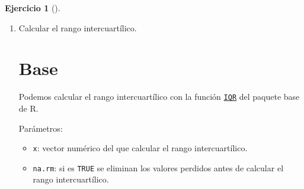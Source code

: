 \documentclass[
  a4paper,
]{scrreport}
\newenvironment{Shaded}{\begin{snugshade}}{\end{snugshade}}
\newcommand{\ExtensionTok}[1]{\textcolor[rgb]{0.00,0.23,0.31}{#1}}
\newcommand{\NormalTok}[1]{\textcolor[rgb]{0.00,0.23,0.31}{#1}}
\providecommand{\tightlist}{%
  \setlength{\itemsep}{0pt}\setlength{\parskip}{0pt}}\usepackage{longtable,booktabs,array}
\theoremstyle{definition}
\newtheorem{exercise}{Ejercicio}[chapter]
\theoremstyle{remark}
\begin{document}
\begin{exercise}[]
\begin{enumerate}
\begin{tcolorbox}
  \begin{longtable}[]{@{}r@{}}
  \toprule\noalign{}
  rango \\
  \midrule\noalign{}
  \endhead
  \bottomrule\noalign{}
  \endlastfoot
  5 \\
  \end{longtable}

  \section{Copilot}

\begin{Shaded}
\begin{Highlighting}[]
\ExtensionTok{Calcular}\NormalTok{ el rango de la columna medicamentos del data frame df.}
\end{Highlighting}
\end{Shaded}

  \end{tcolorbox}
\item
  Calcular el rango intercuartílico.

  \begin{tcolorbox}[enhanced jigsaw, colframe=quarto-callout-tip-color-frame, toprule=.15mm, bottomtitle=1mm, breakable, opacitybacktitle=0.6, toptitle=1mm, colback=white, bottomrule=.15mm, title=\textcolor{quarto-callout-tip-color}{\faLightbulb}\hspace{0.5em}{Solución}, arc=.35mm, left=2mm, titlerule=0mm, rightrule=.15mm, coltitle=black, leftrule=.75mm, opacityback=0, colbacktitle=quarto-callout-tip-color!10!white]

  \section{Base}

  Podemos calcular el rango intercuartílico con la función
  \href{https://www.rdocumentation.org/packages/base/versions/3.6.2/topics/IQR}{\texttt{IQR}}
  del paquete base de R.

  Parámetros:

  \begin{itemize}
  \tightlist
  \item
    \texttt{x}: vector numérico del que calcular el rango
    intercuartílico.
  \item
    \texttt{na.rm}: si es \texttt{TRUE} se eliminan los valores perdidos
    antes de calcular el rango intercuartílico.
  \end{itemize}


\end{tcolorbox}
\end{enumerate}
\end{exercise}
\end{document}
